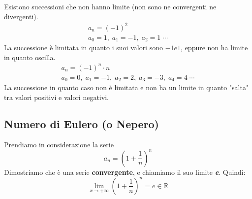 

Esistono successioni che non hanno limite (non sono ne convergenti ne divergenti).
\begin{gather*}
    a_n = (-1)^2\\
    a_0 = 1,\; a_1 = -1,\; a_2 = 1 \;\cdots
\end{gather*}
La successione è limitata in quanto i suoi valori sono $-1 e 1$, eppure non ha limite in quanto oscilla.
\begin{gather*}
    a_n = (-1)^n \cdot n\\
    a_0 = 0,\; a_1 = -1,\; a_2 = 2,\; a_3 = -3,\; a_4 = 4 \;\cdots
\end{gather*}
La successione in quanto caso non è limitata e non ha un limite in quanto "salta" tra valori positivi e valori negativi.

\subsection{Numero di Eulero (o Nepero)} \label{NumeroDiEulero}
Prendiamo in considerazione la serie
\begin{equation*}
    a_n = (1+\dfrac{1}{n})^n
\end{equation*}
Dimostriamo che è una serie \textbf{convergente}, e chiamiamo il suo limite \textbf{\textit{e}}. Quindi:
\begin{equation*}
    \lim_{x\to +\infty} (1+\dfrac{1}{n})^n = e \in \mathbb{R}
\end{equation*}

